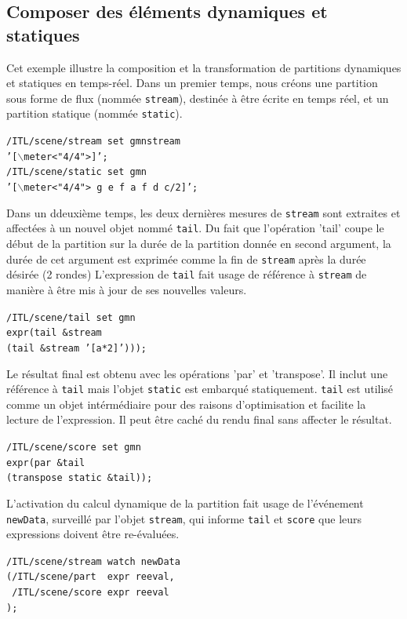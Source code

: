 \documentclass{article}
\newcommand{\OSC}[1]	{{\fontsize{10pt}{10pt} \selectfont\texttt{#1}}}
\newcommand{\tab}{\hspace*{4mm}}
\newcommand{\sample}	[1]			{\vspace{-0.2em}\begin{center}\colorbox{mygrey}{\begin{minipage}[t]{0.97\columnwidth} {\small \texttt{#1}}\end{minipage}}\end{center}}
\begin{document}
\subsection{Composer des éléments dynamiques et statiques}\label{sample3}
Cet exemple illustre la composition et la transformation de partitions dynamiques et statiques en temps-réel.
Dans un premier temps, nous créons une partition sous forme de flux (nommée \OSC{stream}), destinée à être écrite en temps réel, et un partition statique (nommée \OSC{static}).
\sample{/ITL/scene/stream set gmnstream \\
\tab \tab '[$\backslash$meter<"4/4">]';\\
/ITL/scene/static set gmn \\
\tab \tab '[$\backslash$meter<"4/4"> g e f a f d c/2]';
}
Dans un ddeuxième temps, les deux dernières mesures de \OSC{stream} sont extraites et affectées à un nouvel objet nommé\OSC{tail}. Du fait que l'opération 'tail' coupe le début de la partition sur la durée de la partition donnée en second argument, la durée de cet argument est exprimée comme la fin de \OSC{stream} après la durée désirée (2 rondes)
L'expression de \OSC{tail} fait usage de référence à \OSC{stream} de manière à être mis à jour de ses nouvelles valeurs. 
\sample{/ITL/scene/tail set gmn \\
\tab \tab expr(tail \&stream \\
\tab \tab \tab \tab (tail \&stream '[a*2]')));
}
Le résultat final est obtenu avec les opérations 'par' et 'transpose'. Il inclut une référence à \OSC{tail} mais l'objet \OSC{static} est embarqué statiquement. \OSC{tail} est utilisé comme un objet intérmédiaire pour des raisons d'optimisation et facilite la lecture de l'expression. Il peut être caché du rendu final sans affecter le résultat.
\sample{/ITL/scene/score set gmn \\
\tab \tab expr(par \&tail \\
\tab \tab \tab \tab (transpose static \&tail));
}
L'activation du calcul dynamique de la partition fait usage de l'événement \OSC{newData}, surveillé par l'objet \OSC{stream}, qui informe \OSC{tail} et \OSC{score} que leurs expressions doivent être re-évaluées.
\sample{/ITL/scene/stream watch newData \\
\tab \tab (/ITL/scene/part \ expr reeval, \\
\tab \tab \ /ITL/scene/score expr reeval \\
\tab \tab );
}


\end{document}

